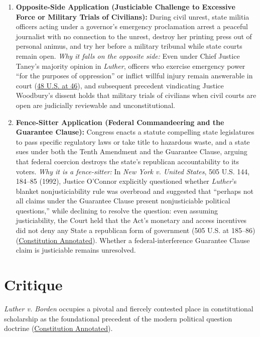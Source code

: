 \documentclass[12pt]{article}
\begin{document}
\begin{enumerate}
\item \textbf{Opposite-Side Application (Justiciable Challenge to Excessive Force or Military Trials of Civilians):} During civil unrest, state militia officers acting under a governor's emergency proclamation arrest a peaceful journalist with no connection to the unrest, destroy her printing press out of personal animus, and try her before a military tribunal while state courts remain open. \textit{Why it falls on the opposite side:} Even under Chief Justice Taney's majority opinion in \textit{Luther}, officers who exercise emergency power ``for the purposes of oppression'' or inflict willful injury remain answerable in court (\href{https://supreme.justia.com/cases/federal/us/48/1/}{48 U.S. at 46}), and subsequent precedent vindicating Justice Woodbury's dissent holds that military trials of civilians when civil courts are open are judicially reviewable and unconstitutional.

\item \textbf{Fence-Sitter Application (Federal Commandeering and the Guarantee Clause):} Congress enacts a statute compelling state legislatures to pass specific regulatory laws or take title to hazardous waste, and a state sues under both the Tenth Amendment and the Guarantee Clause, arguing that federal coercion destroys the state's republican accountability to its voters. \textit{Why it is a fence-sitter:} In \textit{New York v. United States}, 505 U.S. 144, 184--85 (1992), Justice O'Connor explicitly questioned whether \textit{Luther}'s blanket nonjusticiability rule was overbroad and suggested that ``perhaps not all claims under the Guarantee Clause present nonjusticiable political questions,'' while declining to resolve the question: even assuming justiciability, the Court held that the Act's monetary and access incentives did not deny any State a republican form of government (505 U.S. at 185--86) (\href{https://www.law.cornell.edu/constitution-conan/article-3/section-2/clause-1/luther-v-borden-and-the-guarantee-clause}{Constitution Annotated}). Whether a federal-interference Guarantee Clause claim is justiciable remains unresolved.
\end{enumerate}

\section{Critique}

\textit{Luther v. Borden} occupies a pivotal and fiercely contested place in constitutional scholarship as the foundational precedent of the modern political question doctrine (\href{https://www.law.cornell.edu/constitution-conan/article-3/section-2/clause-1/luther-v-borden-and-the-guarantee-clause}{Constitution Annotated}).
\end{document}
